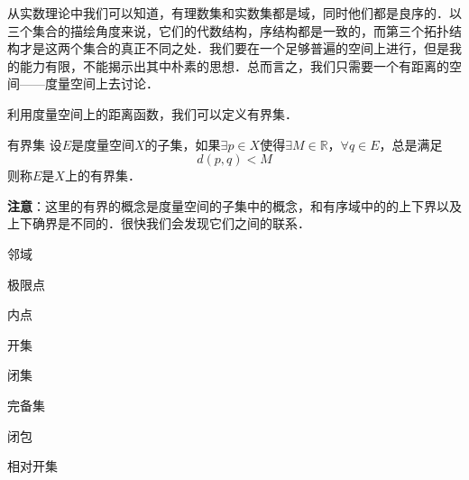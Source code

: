 



从实数理论中我们可以知道，有理数集和实数集都是域，同时他们都是良序的．以三个集合的描绘角度来说，它们的代数结构，序结构都是一致的，而第三个拓扑结构才是这两个集合的真正不同之处．我们要在一个足够普遍的空间上进行，但是我的能力有限，不能揭示出其中朴素的思想．总而言之，我们只需要一个有距离的空间——度量空间上去讨论．

利用度量空间上的距离函数，我们可以定义有界集．

\begin{definition}{有界集}
设$E$是度量空间$X$的子集，如果$\exists{p}\in{X}$使得$\exists{M}\in{\mathbb{R}}$，$\forall{q}\in{E}$，总是满足
\[d(p,q)<M\]
则称$E$是$X$上的有界集．
\end{definition}

\textbf{注意}：这里的有界的概念是度量空间的子集中的概念，和有序域中的的上下界以及上下确界是不同的．很快我们会发现它们之间的联系．

\begin{definition}{邻域}

\end{definition}


\begin{definition}{极限点}

\end{definition}



\begin{definition}{内点}

\end{definition}


\begin{definition}{开集}

\end{definition}


\begin{definition}{闭集}

\end{definition}


\begin{definition}{完备集}

\end{definition}

\begin{definition}{闭包}
\end{definition}

\begin{definition}{相对开集}

\end{definition}